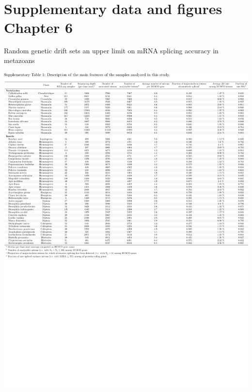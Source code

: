 
\chapter{Supplementary data and figures Chapter 6}\raggedleft\textcolor{BLUEROYAL}{\LARGE{Random genetic drift sets an upper limit on mRNA splicing accuracy in metazoans}}


{\hypersetup{linkcolor=GREYDARK}\minilof\newpage}

\graphicspath{{chap6-Alternative Splicing/figures/}}


\begin{table}[h!]
    \begin{center}                                                                       
        \includegraphics[width=\textwidth] {Table1_supp.pdf}
    \end{center}
    \caption[Description of the main features of the samples analyzed in this study]{}
    \label{table:1}
\end{table}

